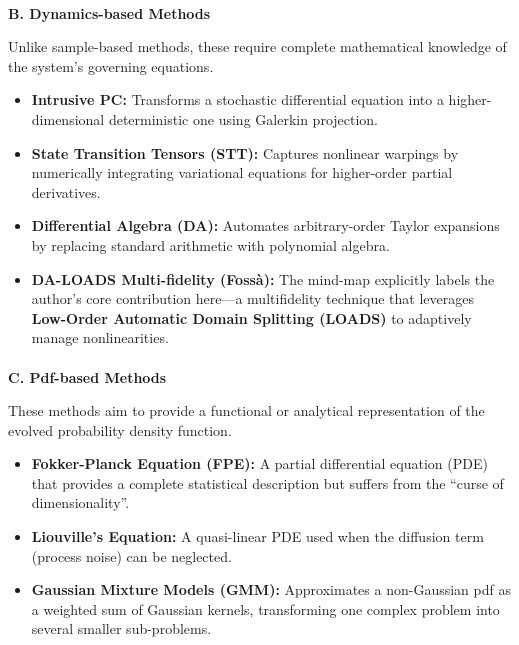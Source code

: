 \documentclass[
  letterpaper,
  DIV=11,
  numbers=noendperiod,
  oneside]{scrartcl}
\makeatletter
\let\oldparagraph\paragraph
\renewcommand{\paragraph}{
    \@ifstar
      \xxxParagraphStar
      \xxxParagraphNoStar
  }
\newcommand{\xxxParagraphStar}[1]{\oldparagraph*{#1}\mbox{}}
\newcommand{\xxxParagraphNoStar}[1]{\oldparagraph{#1}\mbox{}}
\makeatother
\begin{document}
\paragraph{\texorpdfstring{\textbf{B. Dynamics-based
Methods}}{B. Dynamics-based Methods}}\label{b.-dynamics-based-methods}

Unlike sample-based methods, these require complete mathematical
knowledge of the system's governing equations.

\begin{itemize}
\item
  \textbf{Intrusive PC:} Transforms a stochastic differential equation
  into a higher-dimensional deterministic one using Galerkin projection.
\item
  \textbf{State Transition Tensors (STT):} Captures nonlinear warpings
  by numerically integrating variational equations for higher-order
  partial derivatives.
\item
  \textbf{Differential Algebra (DA):} Automates arbitrary-order Taylor
  expansions by replacing standard arithmetic with polynomial algebra.
\item
  \textbf{DA-LOADS Multi-fidelity (Fossà):} The mind-map explicitly
  labels the author's core contribution here---a multifidelity technique
  that leverages \textbf{Low-Order Automatic Domain Splitting (LOADS)}
  to adaptively manage nonlinearities.
\end{itemize}

\paragraph{\texorpdfstring{\textbf{C. Pdf-based
Methods}}{C. Pdf-based Methods}}\label{c.-pdf-based-methods}

These methods aim to provide a functional or analytical representation
of the evolved probability density function.

\begin{itemize}
\item
  \textbf{Fokker-Planck Equation (FPE):} A partial differential equation
  (PDE) that provides a complete statistical description but suffers
  from the ``curse of dimensionality''.
\item
  \textbf{Liouville's Equation:} A quasi-linear PDE used when the
  diffusion term (process noise) can be neglected.
\item
  \textbf{Gaussian Mixture Models (GMM):} Approximates a non-Gaussian
  pdf as a weighted sum of Gaussian kernels, transforming one complex
  problem into several smaller sub-problems.
\end{itemize}
\end{document}

